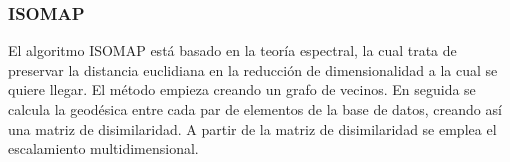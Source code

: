 \subsubsection{ISOMAP \label{sec:isomap_theory}}

El algoritmo ISOMAP está basado en la teoría espectral, la cual trata de preservar la distancia euclidiana en la reducción de dimensionalidad a la cual se quiere llegar. El método empieza creando un grafo de vecinos. En seguida se calcula la geodésica entre cada par de elementos de la base de datos, creando así una matriz de disimilaridad. A partir de la matriz de disimilaridad se emplea el escalamiento multidimensional.